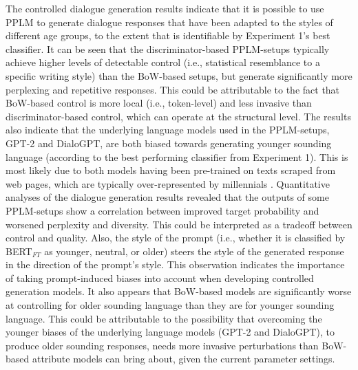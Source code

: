 The controlled dialogue generation results indicate that it is possible to use PPLM to generate dialogue responses that have been adapted to the styles of different age groups, to the extent that is identifiable by Experiment 1's best classifier. It can be seen that the discriminator-based PPLM-setups typically achieve higher levels of detectable control (i.e., statistical resemblance to a specific writing style) than the BoW-based setups, but generate significantly more perplexing and repetitive responses. This could be attributable to the fact that BoW-based control is more local (i.e., token-level) and less invasive than discriminator-based control, which can operate at the structural level. The results also indicate that the underlying language models used in the PPLM-setups, GPT-2 and DialoGPT, are both biased towards generating younger sounding language (according to the best performing classifier from Experiment 1). This is most likely due to both models having been pre-trained on texts scraped from web pages, which are typically over-represented by millennials \citep{radford2019language, zhang2019dialogpt}. 
Quantitative analyses of the dialogue generation results revealed that the outputs of some PPLM-setups show a correlation between improved target probability and worsened perplexity and diversity. This could be interpreted as a tradeoff between control and quality.
Also, the style of the prompt (i.e., whether it is classified by BERT$_{FT}$ as younger, neutral, or older) steers the style of the generated response in the direction of the prompt's style. This observation indicates the importance of taking prompt-induced biases into account when developing controlled generation models. It also appears that BoW-based models are significantly worse at controlling for older sounding language than they are for younger sounding language.
This could be attributable to the possibility that overcoming the younger biases of the underlying language models (GPT-2 and DialoGPT), to produce older sounding responses, needs more invasive perturbations than BoW-based attribute models can bring about, given the current parameter settings.
